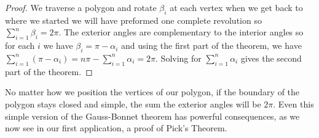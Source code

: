 \begin{proof}

	We traverse a polygon and rotate $\beta_i$ at each vertex
	when we get back to where we started we will have preformed 
	one complete revolution so $\sum_{i=1}^n\beta_i=2\pi.$
	The exterior angles are complementary to the interior angles
	so for each $i$ we have $\beta_i=\pi-\alpha_i$  and using the first
	part of the theorem,  we have
	$\sum_{i=1}^n(\pi-\alpha_i)=n\pi -\sum_{i=1}^n\alpha_i=2\pi$. 
	Solving for $\sum_{i=1}^n\alpha_i$ gives the second part of the theorem.

\end{proof}


No matter how we position the vertices of our polygon,
if the boundary of the polygon stays closed and simple,
the sum the exterior angles will be $2\pi$.
Even this simple version of the Gauss-Bonnet theorem has powerful
consequences, as we now see in our first application, a proof of Pick's Theorem.







